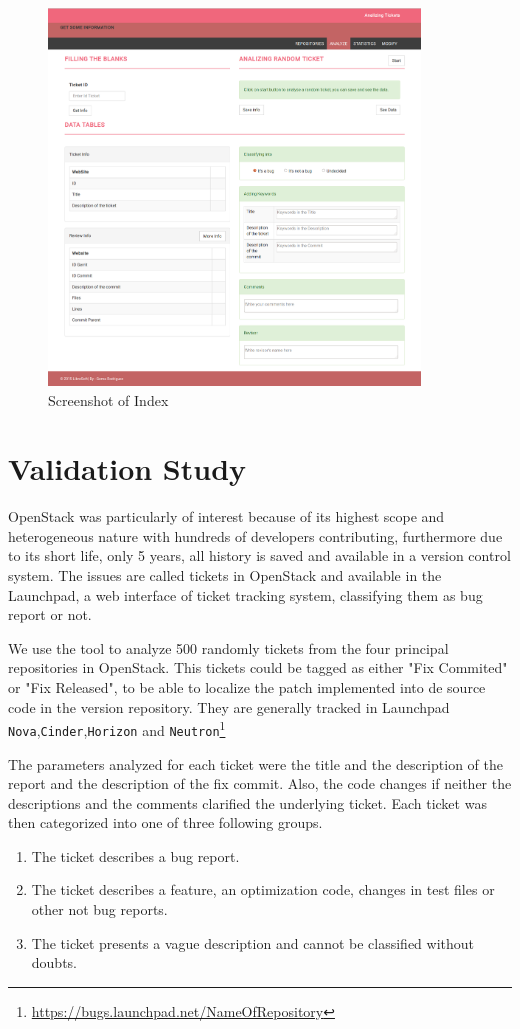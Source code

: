 \documentclass[ifip]{svmult}
\begin{document}
\begin{figure}
\centering
\includegraphics[height=10cm]{index2.png}
\caption{Screenshot of Index}
\label{fig:2}       %
\end{figure}


\section{Validation Study}
\label{sec:3}

OpenStack was particularly of interest because of its highest scope and heterogeneous nature with hundreds of developers contributing, furthermore due to its short life, only 5 years, all history is saved and available in a version control system. The issues are called tickets in OpenStack and available in the Launchpad, a web interface of ticket tracking system, classifying them as bug report or not.

We use the tool to analyze 500 randomly tickets from the four principal repositories in OpenStack. This tickets could be tagged as either "Fix Commited" or "Fix Released", to be able to localize the patch implemented into de source code in the version repository. They are generally tracked in Launchpad \texttt{Nova},\texttt{Cinder},\texttt{Horizon} and \texttt{Neutron}\footnote{\url{https://bugs.launchpad.net/NameOfRepository}}

The parameters analyzed for each ticket were the title and the description of the report and the description of the fix commit. Also, the code changes if neither the descriptions and the comments clarified the underlying ticket. Each ticket was then categorized into one of three following groups.
\begin{enumerate}
  \item The ticket describes a bug report.
  \item The ticket describes a feature, an optimization code, changes in test files or other not bug reports.
  \item The ticket presents a vague description and cannot be classified without doubts.
\end{enumerate}
\end{document}
